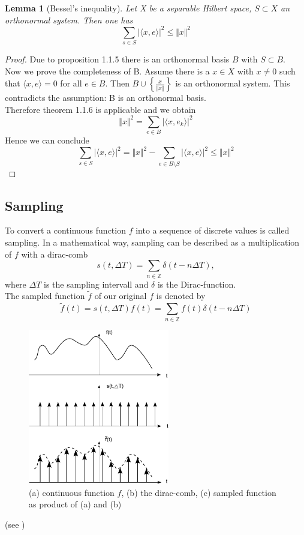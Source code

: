 \documentclass[a4paper, 11pt]{scrreprt}
\newtheorem{lemma}[defi]{Lemma}
\newcommand{\ZZ}{\mathbb{Z}}
\newcommand{\student}[1]{\marginnote{{\normalfont\bf #1}}}
\begin{document}
\begin{lemma}[Bessel's inequality]
Let X be a separable Hilbert space, $S \subset X$ an orthonormal system. Then one has
\[\sum_{s \in S} |\langle x, e \rangle |^2 \leq \Vert x \Vert ^2\]
\end{lemma}
\begin{proof}
Due to proposition 1.1.5 there is an orthonormal basis $B$ with $S \subset B$.\\ 
Now we prove the completeness of B. Assume there is a $x \in X$ with $x \neq 0$ such that $\langle x, e \rangle = 0$ for all $e \in B$. Then $B \cup \left\{\frac{x}{\Vert x \Vert}\right\}$ is an orthonormal system. This contradicts the assumption: B is an orthonormal basis.\\
Therefore theorem 1.1.6 is applicable and we obtain
\[\Vert x \Vert^2 = \sum_{e \in B} |\langle x,e_k \rangle |^2 \]
Hence we can conclude
\[\sum_{s \in S} |\langle x, e \rangle |^2 = \Vert x \Vert ^2 - \sum_{e \in B\setminus S} |\langle x, e \rangle |^2 \leq \Vert x \Vert ^2\]

\end{proof}
\subsection{Sampling}
\student{Dominik}
To convert a continuous function \(f\) into a sequence of discrete values is called sampling. In a mathematical way, sampling can be described as a multiplication of \(f\) with a dirac-comb 
\[s(t,\Delta T) = \sum_{n\in\ZZ} \delta(t-n\Delta T), \]
where \(\Delta T\) is the sampling intervall and \(\delta\) is the Dirac-function.\\
The sampled function \(\tilde{f}\) of our original \(f\) is denoted by
\begin{equation}
	\tilde{f} (t) = s(t,\Delta T) f(t) = \sum_{n\in\ZZ} f(t)\delta(t-n\Delta T)
\end{equation}
\begin{figure}[htpb]
	\centering
	\includegraphics[width=0.55\textwidth]{Sampling-Visualisierung.pdf}
	\caption{(a) continuous function \(f\), (b) the dirac-comb, (c) sampled function as product of (a) and (b)}
\end{figure}
(see \cite{marks02})
\end{document}
